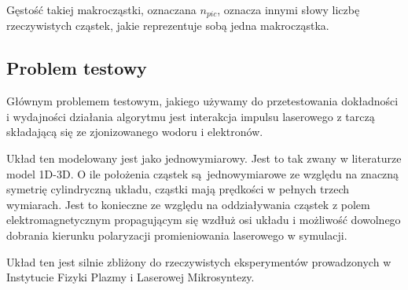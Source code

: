     Gęstość takiej makrocząstki, oznaczana $n_{pic}$, oznacza innymi słowy
    liczbę rzeczywistych cząstek, jakie reprezentuje sobą jedna makrocząstka.

    \subsection{Problem testowy}\label{seq:lasershield}

    Głównym problemem testowym, jakiego używamy do przetestowania dokładności i
    wydajności działania algorytmu jest interakcja impulsu laserowego z tarczą
    składającą się ze zjonizowanego wodoru i elektronów.

    Układ ten modelowany jest jako jednowymiarowy. Jest to tak zwany w
    literaturze model 1D-3D.  O ile położenia cząstek są jednowymiarowe ze
    względu na znaczną symetrię cylindryczną układu, cząstki mają prędkości w
    pełnych trzech wymiarach. Jest to konieczne ze względu na oddziaływania
    cząstek z polem elektromagnetycznym propagującym się wzdłuż osi układu
    i możliwość dowolnego dobrania kierunku polaryzacji promieniowania
    laserowego w symulacji.

    Układ ten jest silnie zbliżony do rzeczywistych eksperymentów prowadzonych
    w Instytucie Fizyki Plazmy i Laserowej Mikrosyntezy.   %

